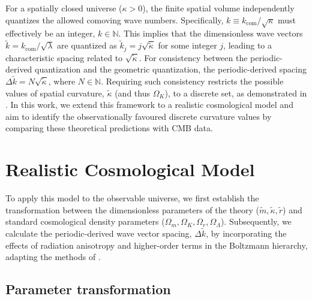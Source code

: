 \documentclass[%
 reprint,
 amsmath,amssymb,
 prd, %
]{revtex4-2}
\begin{document}
For a spatially closed universe ($\kappa > 0$), the finite spatial volume independently quantizes the allowed comoving wave numbers. Specifically, $k \equiv k_{\mathrm{com}}/\sqrt{\kappa}$ must effectively be an integer, $k \in \mathbb{N}$. %
This implies that the dimensionless wave vectors $\tilde k = k_{\mathrm{com}}/\sqrt{\lambda}$ are quantized as $\tilde k_j = j \sqrt{\tilde{\kappa}}$ for some integer $j$, leading to a characteristic spacing related to $\sqrt{\tilde{\kappa}}$. %
For consistency between the periodic-derived quantization and the geometric quantization, the periodic-derived spacing $\Delta \tilde k = N \sqrt{\tilde{\kappa}}$, where $N \in \mathbb{N}$. %
Requiring such consistency restricts the possible values of spatial curvature, $\tilde{\kappa}$ (and thus $\Omega_K$), to a discrete set, as demonstrated in \cite{PhysRevD.110.103528}.
In this work, we extend this framework to a realistic cosmological model and aim to identify the observationally favoured discrete curvature values by comparing these theoretical predictions with CMB data. %

\section{Realistic Cosmological Model}\label{sec:real_cosmology} %

To apply this model to the observable universe, we first establish the transformation between the dimensionless parameters of the theory ($\tilde m, \tilde \kappa, \tilde r$) and standard cosmological density parameters ($\Omega_m, \Omega_K, \Omega_r, \Omega_\Lambda$). %
Subsequently, we calculate the periodic-derived wave vector spacing, $\Delta \tilde k$, by incorporating the effects of radiation anisotropy and higher-order terms in the Boltzmann hierarchy, adapting the methods of \cite{2022PhRvD.105h3515B, 2022PhRvD.105l3508P}. %

\subsection{Parameter transformation}\label{subsec:param_transform}
\end{document}

